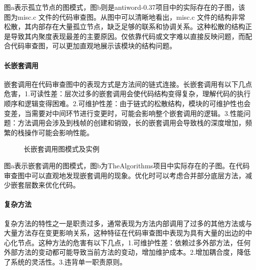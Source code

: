 图a表示孤立节点的图模式，图b则是antiword-0.37项目中的实际存在的子图，该图为misc.c 文件的代码审查图。从图中可以清晰地看出，misc.c 文件的结构非常松散，其内部存在大量孤立节点，缺乏足够的联系和协调关系。这种松散的结构正是导致其内聚度表现最差的主要原因。仅依靠代码或文字难以直接反映问题，而配合代码审查图，可以更加直观地展示该模块的结构问题。

\paragraph{长嵌套调用} 嵌套调用在代码审查图中的表现方式是方法间的链式连接。长嵌套调用有以下几点危害，1.可读性差：层次过多的嵌套调用会使代码结构变得复杂，理解代码的执行顺序和逻辑变得困难。2.可维护性差：由于链式的松散结构，模块的可维护性也会变差，当需要对中间环节进行变更时，可能会影响整个嵌套调用的逻辑。3.性能问题：方法调用会涉及到栈帧的创建和销毁，长的嵌套调用会导致栈的深度增加，频繁的栈操作可能会影响性能。


\begin{figure}[!h]
    \setlength{\subfigcapskip}{-1bp}
    \centering
    \begin{minipage}{\textwidth}
    \centering
    \hspace{2em}
    \end{minipage}
    \vspace{0.2em}
    \caption{长嵌套调用图模式及实例} %
\end{figure}

图a表示嵌套调用的图模式，图b为TheAlgorithms项目中实际存在的子图。在代码审查图中可以直观地发现嵌套调用的现象。优化时可以考虑合并部分底层方法，减少嵌套层数来优化代码。


\paragraph{复杂方法} 复杂方法的特性之一是职责过多，通常表现为方法内部调用了过多的其他方法或与大量方法存在变更影响关系，这种特征在代码审查图中表现为具有大量的出边的中心化节点。这种方法的危害有以下几点，1.可维护性差：依赖过多外部方法，任何外部方法的变动都可能导致当前方法的变动，增加维护成本。2.增加耦合度，降低了系统的灵活性。3.违背单一职责原则。

